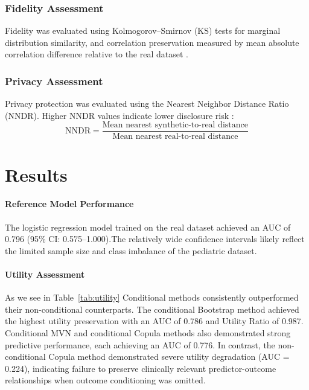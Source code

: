 \documentclass[twoside]{article}
\begin{document}
\subsubsection{Fidelity Assessment}

\noindent Fidelity was evaluated using Kolmogorov--Smirnov (KS) tests for marginal distribution similarity, and correlation preservation measured by mean absolute correlation difference relative to the real dataset \cite{hernandez2025comprehensive}.

\subsubsection{Privacy Assessment}

\noindent Privacy protection was evaluated using the Nearest Neighbor Distance Ratio (NNDR). Higher NNDR values indicate lower disclosure risk \cite{hernandez2025comprehensive}:
\[
\text{NNDR} =
\frac{
\text{Mean nearest synthetic-to-real distance}
}{
\text{Mean nearest real-to-real distance}
}
\]

\section{Results}

\paragraph {Reference Model Performance} The logistic regression model trained on the real dataset achieved an AUC of 0.796 (95\% CI: 0.575--1.000).The relatively wide confidence intervals likely reflect the limited sample size and class imbalance of the pediatric dataset.

\paragraph {Utility Assessment} As we see in Table~\ref{tab:utility} Conditional methods consistently outperformed their non-conditional counterparts. The conditional Bootstrap method achieved the highest utility preservation with an AUC of 0.786 and Utility Ratio of 0.987. Conditional MVN and conditional Copula methods also demonstrated strong predictive performance, each achieving an AUC of 0.776. In contrast, the non-conditional Copula method demonstrated severe utility degradation (AUC = 0.224), indicating failure to preserve clinically relevant predictor-outcome relationships when outcome conditioning was omitted.
\end{document}
